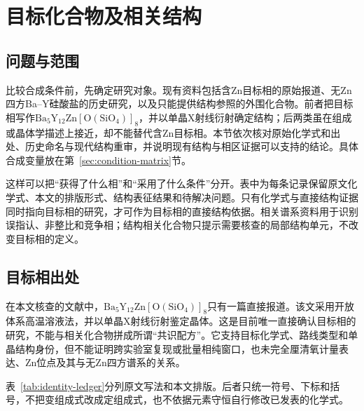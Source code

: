 \section{目标化合物及相关结构}
\label{sec:identity}

\subsection{问题与范围}

比较合成条件前，先确定研究对象。现有资料包括含Zn目标相的原始报道、无Zn四方Ba--Y硅酸盐的历史研究，以及只能提供结构参照的外围化合物。前者把目标相写作$\mathrm{Ba_5Y_{12}Zn[O(SiO_4)]_8}$，并以单晶X射线衍射确定结构\cite{ababaikeri2024ba5y12zn}；后两类虽在组成或晶体学描述上接近，却不能替代含Zn目标相。本节依次核对原始化学式和出处、历史命名与现代结构重审，并说明现有结构与相区证据可以支持的结论。具体合成变量放在第~\ref{sec:condition-matrix}节。

这样可以把“获得了什么相”和“采用了什么条件”分开。表中为每条记录保留原文化学式、本文的排版形式、结构表征结果和待解决问题。只有化学式与直接结构证据同时指向目标相的研究，才可作为目标相的直接结构依据。相关谱系资料用于识别误指认、非整比和竞争相；结构相关化合物只提示需要核查的局部结构单元，不改变目标相的定义。

\subsection{目标相出处}

在本文核查的文献中，$\mathrm{Ba_5Y_{12}Zn[O(SiO_4)]_8}$只有一篇直接报道\cite{ababaikeri2024ba5y12zn}。该文采用开放体系高温溶液法，并以单晶X射线衍射鉴定晶体\cite{ababaikeri2024ba5y12zn}。这是目前唯一直接确认目标相的研究，不能与相关化合物拼成所谓“共识配方”。它支持目标化学式、路线类型和单晶结构身份，但不能证明跨实验室复现或批量相纯窗口，也未完全厘清氧计量表达、Zn位点及其与无Zn四方谱系的关系。

表~\ref{tab:identity-ledger}分列原文写法和本文排版。后者只统一符号、下标和括号，不把变组成式改成定组成式，也不依据元素守恒自行修改已发表的化学式。


